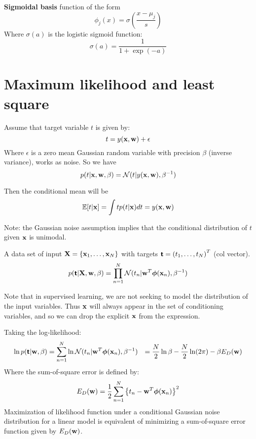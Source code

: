 \textbf{Sigmoidal basis} function of the form
\begin{equation}
    \phi_j(x) = \sigma\left( \frac{x-\mu_j}{s} \right)
\end{equation}
Where $\sigma(a)$ is the logistic sigmoid function:
\begin{equation}
    \sigma(a) = \frac{1}{1+\exp(-a)}
\end{equation}

\section{Maximum likelihood and least square}
Assume that target variable $t$ is given by:
\begin{equation}
    t = y(\mathbf{x}, \mathbf{w}) + \epsilon
\end{equation}
Where $\epsilon$ is a zero mean Gaussian random variable with precision
$\beta$ (inverse variance), works as noise. So we have
\begin{equation}
    p(t|\mathbf{x}, \mathbf{w}, \beta) = \mathcal{N}(t|y(\mathbf{x}, \mathbf{w}), \beta^{-1})
\end{equation}

Then the conditional mean will be 
\begin{equation}
    \mathbb{E}[t|\mathbf{x}] = \int t p(t|\mathbf{x}) dt = y(\mathbf{x}, \mathbf{w})
\end{equation}

Note: the Gaussian noise assumption implies that the conditional
distribution of $t$ given $\mathbf{x}$ is unimodal.

A data set of input $\mathbf{X} = \left\{ \mathbf{x}_1, \dots, \mathbf{x}_N \right\}$
with targets $\boldsymbol{\mathsf{t}}={(t_1, \dots, t_N)}^T$ (col vector). 
\begin{equation}
    p(\boldsymbol{\mathsf{t}}|\mathbf{X}, \mathbf{w}, \beta)= \prod_{n=1}^N \mathcal{N}(t_n|\mathbf{w}^T
    \boldsymbol\phi(\mathbf{x}_n), \beta^{-1})
\end{equation}

Note that in supervised learning, we are not seeking to model the
distribution of the input variables. Thus $\mathbf{x}$ will always appear in the
set of conditioning variables, and so we can drop the explicit $\mathbf{x}$ from
the expression.

Taking the log-likelihood:
\begin{align}
    \ln p(\boldsymbol{\mathsf{t}}| \mathbf{w}, \beta) &= \sum_{n=1}^N \ln
    \mathcal{N}(t_n|\mathbf{w}^T\boldsymbol\phi(\mathbf{x}_n), \beta^{-1})
    &=\frac{N}{2} \ln \beta - \frac{N}{2}\ln(2\pi) - \beta E_D(\mathbf{w})
    \label{lin-likelihood}
\end{align}
Where the sum-of-square error is defined by:
\begin{equation}
    E_D(\mathbf{w}) = \frac{1}{2}\sum_{n=1}^N {\left\{ t_n - \mathbf{w}^T
    \boldsymbol\phi(\mathbf{x}_n) \right\}}^2
\end{equation}
Maximization of likelihood function under a conditional Gaussian noise
distribution for a linear model is equivalent of minimizing a
sum-of-square error function given by $E_D(\mathbf{w})$.

